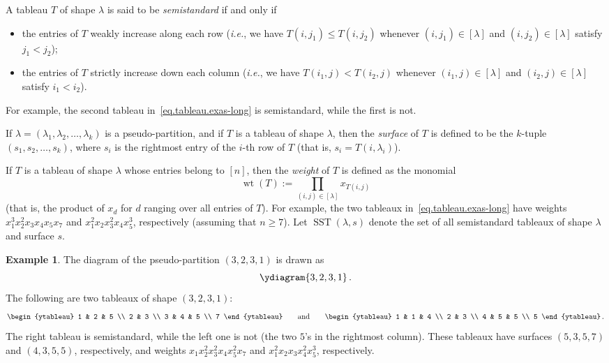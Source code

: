 \documentclass[reqno]{amsart}
\newcommand{\0}{\phantom{c}}
\newcommand{\diag}[1]{\left[#1\right]} %
\DeclareMathOperator{\wt}{wt} %
\DeclareMathOperator{\SST}{SST} %
\let\prodnonlimits\prod
\renewcommand{\prod}{\prodnonlimits\limits}
\newenvironment{verlong}{}{}
\newcommand{\tup}[1]{\left( #1 \right)}
\newcommand{\ive}[1]{\left[ #1 \right]}
\newcommand{\defn}[1]{{\color{darkred}\emph{#1}}} %
\theoremstyle{plain}
\theoremstyle{definition}
\newtheorem{example}[thm]{Example}
\numberwithin{equation}{section}
\begin{document}
A tableau $T$ of shape $\lambda$ is said to be \defn{semistandard} if and only if
\begin{itemize}
\item the entries of $T$ weakly increase along each row (\textit{i.e.}, we have $T(i,j_1) \leq T(i,j_2)$ whenever $(i,j_1) \in \diag{\lambda}$ and $(i,j_2) \in \diag{\lambda}$ satisfy $j_1 < j_2$);

\item the entries of $T$ strictly increase down each column (\textit{i.e.}, we have $T(i_1,j) < T(i_2,j)$ whenever $(i_1,j) \in \diag{\lambda}$ and $(i_2,j) \in \diag{\lambda}$ satisfy $i_1 < i_2$).
\end{itemize}

\begin{verlong}
For example, the second tableau in~\eqref{eq.tableau.exas-long} is semistandard, while the first is not.
\end{verlong}

If $\lambda = \tup{\lambda_1, \lambda_2, \dotsc, \lambda_k}$ is a pseudo-partition, and if $T$ is a tableau of shape $\lambda$,
then the \defn{surface} of $T$ is defined to be the $k$-tuple $(s_1, s_2, \dotsc, s_k)$, where $s_i$ is the rightmost entry of the $i$-th row of $T$ (that is, $s_i = T(i,\lambda_i)$).

If $T$ is a tableau of shape $\lambda$ whose entries belong to $\ive{n}$, then the \defn{weight} of $T$ is defined as the monomial
\[
\wt(T) := \prod_{(i,j) \in \diag{\lambda}} x_{T(i,j)}
\]
(that is, the product of $x_{d}$ for $d$ ranging over all entries of $T$).
\begin{verlong}
For example, the two tableaux in~\eqref{eq.tableau.exas-long} have weights $x_1^{3}x_2^{2}x_{3}x_{4}x_{5}x_{7}$ and $x_1^{2}x_2x_{3}^{2}x_{4}x_{5}^{3}$, respectively (assuming that $n \geq 7$).
\end{verlong}
Let $\SST(\lambda, s)$ denote the set of all semistandard tableaux of shape $\lambda$ and surface $s$.

\begin{example}
The diagram of the pseudo-partition $\tup{3,2,3,1}$ is drawn as
\[
\ydiagram{3,2,3,1}\,.
\]
The following are two tableaux of shape $\tup{3,2,3,1}$:
\[
\label{eq.tableau.exas}
\begin{ytableau} 1 & 2 & 5 \\ 2 & 3 \\ 3 & 4 & 5 \\ 7 \end{ytableau}\qquad
\text{and}\qquad
\begin{ytableau} 1 & 1 & 4 \\ 2 & 3 \\ 4 & 5 & 5 \\ 5 \end{ytableau}\,.
\]
The right tableau is semistandard, while the left one is not (the two $5$'s in the rightmost column).
These tableaux have surfaces $(5,3,5,7)$ and $(4,3,5,5)$, respectively, and weights $x_1 x_2^2 x_3^2 x_4 x_5^2 x_7$ and $x_1^2 x_2 x_3 x_4^2 x_5^3$, respectively.
\end{example}
\end{document}
